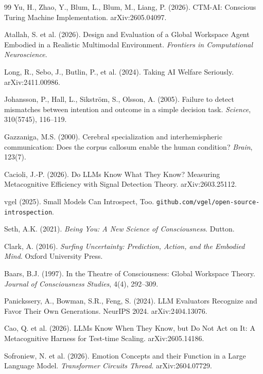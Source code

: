 \documentclass[11pt]{article}
\begin{document}
\begin{thebibliography}{99}
Yu, H., Zhao, Y., Blum, L., Blum, M., Liang, P. (2026).
CTM-AI: Conscious Turing Machine Implementation. arXiv:2605.04097.

Atallah, S. et al. (2026).
Design and Evaluation of a Global Workspace Agent Embodied in a Realistic
Multimodal Environment. \emph{Frontiers in Computational Neuroscience}.

Long, R., Sebo, J., Butlin, P., et al. (2024).
Taking AI Welfare Seriously. arXiv:2411.00986.

Johansson, P., Hall, L., Sikstr\"om, S., Olsson, A. (2005).
Failure to detect mismatches between intention and outcome in a simple
decision task. \emph{Science}, 310(5745), 116--119.

Gazzaniga, M.S. (2000).
Cerebral specialization and interhemispheric communication: Does the
corpus callosum enable the human condition? \emph{Brain}, 123(7).

Cacioli, J.-P. (2026).
Do LLMs Know What They Know? Measuring Metacognitive Efficiency with
Signal Detection Theory. arXiv:2603.25112.

vgel (2025).
Small Models Can Introspect, Too.
\texttt{github.com/\allowbreak{}vgel/\allowbreak{}open-\allowbreak{}source-\allowbreak{}introspection}.

Seth, A.K. (2021).
\emph{Being You: A New Science of Consciousness}. Dutton.

Clark, A. (2016).
\emph{Surfing Uncertainty: Prediction, Action, and the Embodied Mind}.
Oxford University Press.

Baars, B.J. (1997).
In the Theatre of Consciousness: Global Workspace Theory.
\emph{Journal of Consciousness Studies}, 4(4), 292--309.

Panickssery, A., Bowman, S.R., Feng, S. (2024).
LLM Evaluators Recognize and Favor Their Own Generations.
NeurIPS 2024. arXiv:2404.13076.

Cao, Q. et al. (2026).
LLMs Know When They Know, but Do Not Act on It: A Metacognitive Harness
for Test-time Scaling. arXiv:2605.14186.

Sofroniew, N. et al. (2026).
Emotion Concepts and their Function in a Large Language Model.
\emph{Transformer Circuits Thread}. arXiv:2604.07729.


\end{thebibliography}
\end{document}
